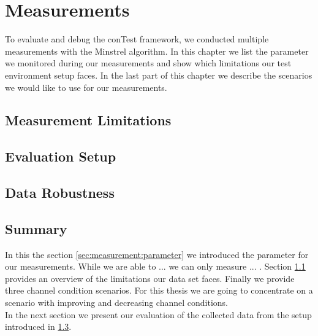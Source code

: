 \chapter{Measurements}
\label{chap:mmeasurement}

To evaluate and debug the conTest framework, we conducted multiple measurements with the Minstrel algorithm. In this chapter we list the parameter we monitored during our measurements and show which limitations our test environment setup faces. In the last part of this chapter we describe the scenarios we would like to use for our measurements.\\

%


\section{Measurement Limitations}
\label{sec:measurement:limits}
%

%

\section{Evaluation Setup}
\label{sec:measurement:eval_setup}
%


%
\newpage
%
 

\section{Data Robustness}
\label{sec:measurement:eval_setup}
%


%
\newpage
%
 

\section{Summary}

In this the section \ref{sec:measurement:parameter} we introduced the parameter for our measurements. While we are able to ... we can only measure ... . Section \ref{sec:measurement:limits} provides an overview of the limitations our data set faces. Finally we provide three channel condition scenarios. For this thesis we are going to concentrate on a scenario with improving and decreasing channel conditions.\\
In the next section we present our evaluation of the collected data from the setup introduced in \ref{sec:measurement:eval_setup}.\\


%
